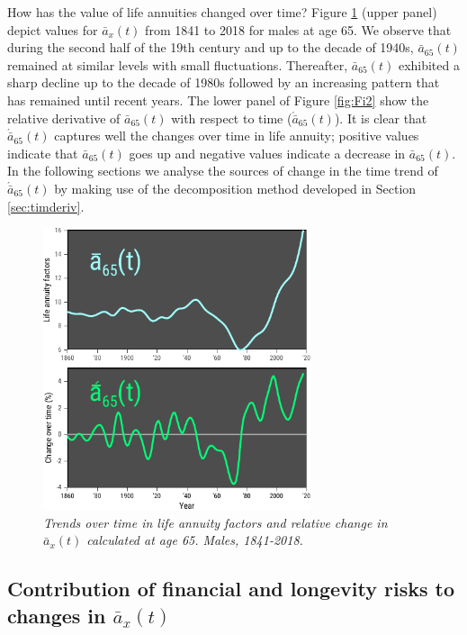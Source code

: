 \documentclass[12pt]{article}
\begin{document}
How has the value of life annuities changed over time? Figure \ref{fig:Fig2} (upper panel) depict values for $\bar{a}_x(t)$ from 1841 to 2018 for males at age 65. We observe that during the second half of the 19th century and up to the decade of 1940s, $\bar{a}_{65}(t)$ remained at similar levels with small fluctuations. Thereafter, $\bar{a}_{65}(t)$ exhibited a sharp decline up to the decade of 1980s followed by an increasing pattern that has remained until recent years. The lower panel of Figure \ref{fig:Fi2} show the relative derivative of $\bar{a}_{65}(t)$ with respect to time ($\acute{\bar{a}}_{65}(t)$). It is clear that $\acute{\bar{a}}_{65}(t)$ captures well the changes over time in life annuity; positive values indicate that $\bar{a}_{65}(t)$ goes up and negative values indicate a decrease in $\bar{a}_{65}(t)$. In the following sections we analyse the sources of change in the time trend of $\acute{\bar{a}}_{65}(t)$ by making use of the decomposition method developed in Section \ref{sec:timderiv}.

  \begin{figure}[!ht]
  	\centering
  	\includegraphics[width=0.7\textwidth]{Fig/Fig2}
  	\caption{\textit{Trends over time in life annuity factors and relative change in $\bar{a}_x(t)$ calculated at age 65. Males, 1841-2018.}}
  	\label{fig:Fig2}
  \end{figure}
  
  

\subsection{Contribution of financial and longevity risks to changes in $\bar{a}_x(t)$}
\end{document}
